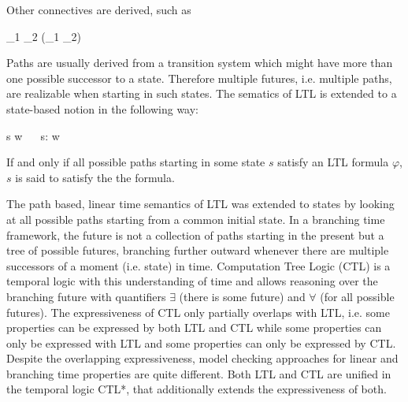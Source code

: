     Other connectives are derived, such as

    \startformula
        \startalign[n=3,align={right,left,middle}]
            \NC \varphi_1 \vee \varphi_2 \NC \colonequals \neg(\neg \varphi_1 \wedge \neg \varphi_2) ~~~\NC {} \NR
            \NC \Finally \varphi \NC \colonequals \True \Until \varphi \NC {} \NR
            \NC \Globally \varphi \NC \colonequals \neg \Finally \neg \varphi \NC {} \NR
        \stopalign
    \stopformula

    Paths are usually derived from a transition system which might have more than one possible successor to a state.
    Therefore multiple futures, i.e. multiple paths, are realizable when starting in such states.
    The sematics of LTL is extended to a state-based notion in the following way:

    \startformula
        s \vDash \phi \iff \forall w ~~ s: w \vDash \phi \EndPeriod
    \stopformula

    If and only if all possible paths starting in some state $s$ satisfy an LTL formula $\varphi$, $s$ is said to satisfy the the formula.

\stopsubsection


\startsubsection[title={Other Temporal Logics}]

    The path based, linear time semantics of LTL was extended to states by looking at all possible paths starting from a common initial state.
    In a branching time framework, the future is not a collection of paths starting in the present but a tree of possible futures, branching further outward whenever there are multiple successors of a moment (i.e. state) in time.
    Computation Tree Logic (CTL) is a temporal logic with this understanding of time and allows reasoning over the branching future with quantifiers $\exists$ (there is some future) and $\forall$ (for all possible futures).
    The expressiveness of CTL only partially overlaps with LTL, i.e. some properties can be expressed by both LTL and CTL while some properties can only be expressed with LTL and some properties can only be expressed by CTL. %
    Despite the overlapping expressiveness, model checking approaches for linear and branching time properties are quite different. %
    Both LTL and CTL are unified in the temporal logic CTL*, that additionally extends the expressiveness of both.

